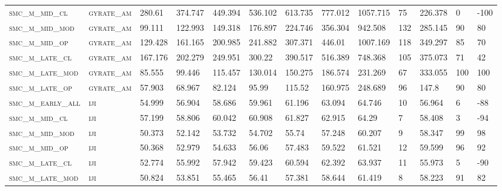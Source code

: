 \begin{landscape}
\begin{center}
\begin{footnotesize}
\begin{longtable}{lllllllllllll}
\textsc{smc\_m\_mid\_cl   } & \textsc{gyrate\_am}   & 280.61   & 374.747  & 449.394  & 536.102  & 613.735  & 777.012  & 1057.715 & 75     & 226.378       & 0             & -100     \\
\textsc{smc\_m\_mid\_mod  } & \textsc{gyrate\_am}   & 99.111   & 122.993  & 149.318  & 176.897  & 224.746  & 356.304  & 942.508  & 132    & 285.145       & 90            & 80       \\
\textsc{smc\_m\_mid\_op   } & \textsc{gyrate\_am}   & 129.428  & 161.165  & 200.985  & 241.882  & 307.371  & 446.01   & 1007.169 & 118    & 349.297       & 85            & 70       \\
\textsc{smc\_m\_late\_cl  } & \textsc{gyrate\_am}   & 167.176  & 202.279  & 249.951  & 300.22   & 390.517  & 516.389  & 748.368  & 105    & 375.073       & 71            & 42       \\
\textsc{smc\_m\_late\_mod } & \textsc{gyrate\_am}   & 85.555   & 99.446   & 115.457  & 130.014  & 150.275  & 186.574  & 231.269  & 67     & 333.055       & 100           & 100      \\
\textsc{smc\_m\_late\_op  } & \textsc{gyrate\_am}   & 57.903   & 68.967   & 82.124   & 95.99    & 115.52   & 160.975  & 248.689  & 96     & 147.8         & 90            & 80       \\
\textsc{smc\_m\_early\_all} & \textsc{iji       }   & 54.999   & 56.904   & 58.686   & 59.961   & 61.196   & 63.094   & 64.746   & 10     & 56.964        & 6             & -88      \\
\textsc{smc\_m\_mid\_cl   } & \textsc{iji       }   & 57.199   & 58.806   & 60.042   & 60.908   & 61.827   & 62.915   & 64.29    & 7      & 58.408        & 3             & -94      \\
\textsc{smc\_m\_mid\_mod  } & \textsc{iji       }   & 50.373   & 52.142   & 53.732   & 54.702   & 55.74    & 57.248   & 60.207   & 9      & 58.347        & 99            & 98       \\
\textsc{smc\_m\_mid\_op   } & \textsc{iji       }   & 50.368   & 52.979   & 54.633   & 56.06    & 57.483   & 59.522   & 61.521   & 12     & 59.599        & 96            & 92       \\
\textsc{smc\_m\_late\_cl  } & \textsc{iji       }   & 52.774   & 55.992   & 57.942   & 59.423   & 60.594   & 62.392   & 63.937   & 11     & 55.973        & 5             & -90      \\
\textsc{smc\_m\_late\_mod } & \textsc{iji       }   & 50.824   & 53.851   & 55.465   & 56.41    & 57.381   & 58.644   & 61.419   & 8      & 58.223        & 91            & 82       \\

\end{longtable}
\end{footnotesize}
\end{center}
\end{landscape}
